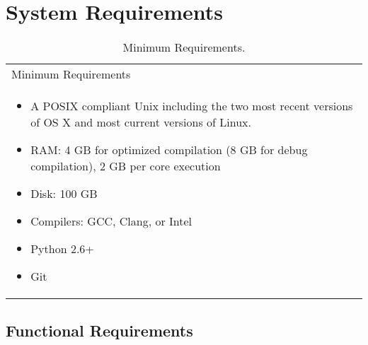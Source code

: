\documentclass{INLreport}
\begin{document}
\section{System Requirements}

\begin{table}[!htbp]
  \caption{Minimum Requirements.\label{tab:req}}
  \begin{tabular}{|p{12cm}|}
    \rowcolor{gray}
    Minimum Requirements \\
    \begin{itemize}
    \item A POSIX compliant Unix including the two most recent versions of OS X and most current versions of Linux.
    \item RAM: 4 GB for optimized compilation (8 GB for debug compilation), 2 GB per core execution
    \item Disk: 100 GB
    \item Compilers: GCC, Clang, or Intel
    \item Python 2.6+
    \item Git
    \end{itemize} \\
    \hline
  \end{tabular}
\end{table}


\subsection{Functional Requirements}
\end{document}
